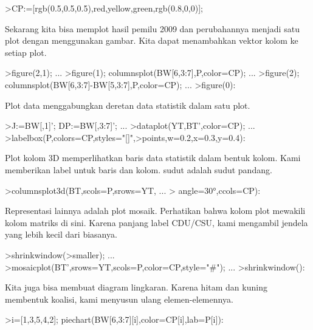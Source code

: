\documentclass[a4paper,10pt]{article}
\begin{document}
\begin{eulernotebook}
\begin{eulercomment}
\begin{eulercomment}
\begin{eulerprompt}
>CP:=[rgb(0.5,0.5,0.5),red,yellow,green,rgb(0.8,0,0)];
\end{eulerprompt}
\begin{eulercomment}
Sekarang kita bisa memplot hasil pemilu 2009 dan perubahannya menjadi
satu plot dengan menggunakan gambar. Kita dapat menambahkan vektor
kolom ke setiap plot.
\end{eulercomment}
\begin{eulerprompt}
>figure(2,1);  ...
>figure(1); columnsplot(BW[6,3:7],P,color=CP); ...
>figure(2); columnsplot(BW[6,3:7]-BW[5,3:7],P,color=CP);  ...
>figure(0):
\end{eulerprompt}
\begin{eulercomment}
Plot data menggabungkan deretan data statistik dalam satu plot.
\end{eulercomment}
\begin{eulerprompt}
>J:=BW[,1]'; DP:=BW[,3:7]'; ...
>dataplot(YT,BT',color=CP);  ...
>labelbox(P,colors=CP,styles="[]",>points,w=0.2,x=0.3,y=0.4):
\end{eulerprompt}
\begin{eulercomment}
Plot kolom 3D memperlihatkan baris data statistik dalam bentuk kolom.
Kami memberikan label untuk baris dan kolom. sudut adalah sudut
pandang.
\end{eulercomment}
\begin{eulerprompt}
>columnsplot3d(BT,scols=P,srows=YT, ...
>  angle=30°,ccols=CP):
\end{eulerprompt}
\begin{eulercomment}
Representasi lainnya adalah plot mosaik. Perhatikan bahwa kolom plot
mewakili kolom matriks di sini. Karena panjang label CDU/CSU, kami
mengambil jendela yang lebih kecil dari biasanya.
\end{eulercomment}
\begin{eulerprompt}
>shrinkwindow(>smaller);  ...
>mosaicplot(BT',srows=YT,scols=P,color=CP,style="#"); ...
>shrinkwindow():
\end{eulerprompt}
\begin{eulercomment}
Kita juga bisa membuat diagram lingkaran. Karena hitam dan kuning
membentuk koalisi, kami menyusun ulang elemen-elemennya.
\end{eulercomment}
\begin{eulerprompt}
>i=[1,3,5,4,2]; piechart(BW[6,3:7][i],color=CP[i],lab=P[i]):
\end{eulerprompt}
\begin{eulercomment}

\end{eulercomment}
\end{eulercomment}
\end{eulercomment}
\end{eulernotebook}
\end{document}
